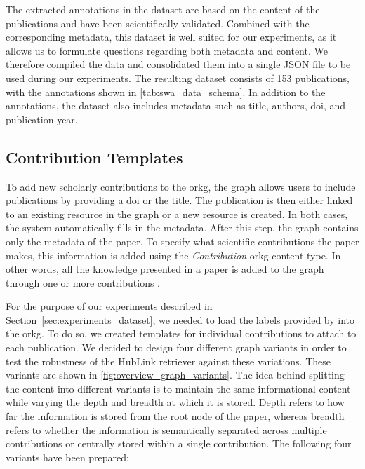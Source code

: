 The extracted annotations in the dataset are based on the content of the publications and have been scientifically validated. Combined with the corresponding metadata, this dataset is well suited for our experiments, as it allows us to formulate questions regarding both metadata and content. We therefore compiled the data and consolidated them into a single JSON file to be used during our experiments. The resulting dataset consists of 153 publications, with the annotations shown in \autoref{tab:swa_data_schema}. In addition to the annotations, the dataset also includes metadata such as title, authors, \gls{doi}, and publication year.

\subsection{Contribution Templates}
\label{sec:contribution_templates}

To add new scholarly contributions to the \gls{orkg}, the graph allows users to include publications by providing a \gls{doi} or the title. The publication is then either linked to an existing resource in the graph or a new resource is created. In both cases, the system automatically fills in the metadata. After this step, the graph contains only the metadata of the paper. To specify what scientific contributions the paper makes, this information is added using the \emph{Contribution} \gls{orkg} content type. In other words, all the knowledge presented in a paper is added to the graph through one or more contributions \cite[58-60]{ilangovan_open_2024}.

For the purpose of our experiments described in Section~\ref{sec:experiments_dataset}, we needed to load the labels provided by \cite{konersmann_evaluation_2022} into the \gls{orkg}. To do so, we created templates for individual contributions to attach to each publication. We decided to design four different graph variants in order to test the robustness of the HubLink retriever against these variations. These variants are shown in \autoref{fig:overview_graph_variants}. The idea behind splitting the content into different variants is to maintain the same informational content while varying the depth and breadth at which it is stored. Depth refers to how far the information is stored from the root node of the paper, whereas breadth refers to whether the information is semantically separated across multiple contributions or centrally stored within a single contribution. The following four variants have been prepared:

